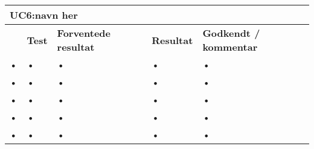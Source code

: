 
\begin{longtable}{|p{5mm}|p{40mm}|p{40mm}|p{20mm}|p{25mm}|}
\hline 
\multicolumn{5}{|l|}{\textbf{UC6:navn her}} \\ 
\hline 
& \textbf{Test} & \textbf{Forventede resultat} & \textbf{Resultat} & \textbf{Godkendt / kommentar} \\ 
\hline 
• & • & • & • & • \\ 
\hline 
• & • & • & • & • \\ 
\hline 
• & • & • & • & • \\ 
\hline 
• & • & • & • & • \\ 
\hline 
• & • & • & • & • \\ 
\hline 
\end{longtable} 